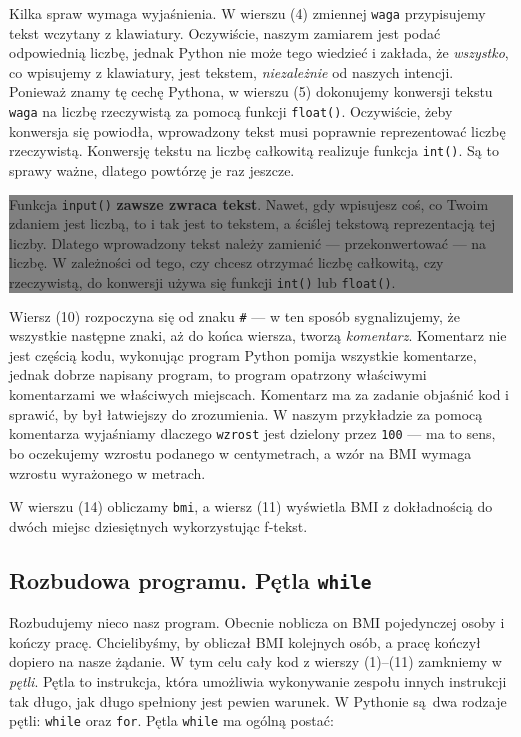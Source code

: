 \documentclass[a4paper]{article}
\newcommand{\important}[1]{
    \begin{center}\colorbox{gray}{
        \begin{minipage}[t]{0.9\textwidth}{#1}
        \end{minipage}
    }
    \end{center}
}
\begin{document}
Kilka spraw wymaga wyjaśnienia. W wierszu (4) zmiennej \texttt{waga} przypisujemy tekst wczytany z klawiatury. Oczywiście, naszym zamiarem jest podać odpowiednią liczbę, jednak Python nie może tego wiedzieć i zakłada, że \emph{wszystko}, co wpisujemy z klawiatury, jest tekstem, \emph{niezależnie} od naszych intencji. Ponieważ znamy tę cechę Pythona, w wierszu (5) dokonujemy konwersji tekstu \texttt{waga} na liczbę rzeczywistą za pomocą funkcji \lstinline|float()|. Oczywiście, żeby konwersja się powiodła, wprowadzony tekst musi poprawnie reprezentować liczbę rzeczywistą. Konwersję tekstu na liczbę całkowitą realizuje funkcja \lstinline|int()|. Są to sprawy ważne, dlatego powtórzę je raz jeszcze.

\important{
  Funkcja \texttt{input()} \textbf{zawsze zwraca tekst}. Nawet, gdy wpisujesz coś, co Twoim zdaniem jest liczbą, to i tak jest to tekstem, a ściślej tekstową reprezentacją tej liczby. Dlatego wprowadzony tekst należy zamienić --- przekonwertować --- na liczbę. W zależności od tego, czy chcesz otrzymać liczbę całkowitą, czy rzeczywistą, do konwersji używa się funkcji \texttt{int()} lub \texttt{float()}.}

Wiersz (10) rozpoczyna się od znaku \texttt{\#} --- w ten sposób sygnalizujemy, że wszystkie następne znaki, aż do końca wiersza, tworzą \emph{komentarz}. Komentarz nie jest częścią kodu, wykonując program Python pomija wszystkie komentarze, jednak dobrze napisany program, to program opatrzony właściwymi komentarzami we właściwych miejscach. Komentarz ma za zadanie objaśnić kod i sprawić, by był łatwiejszy do zrozumienia. W naszym przykładzie za pomocą komentarza wyjaśniamy dlaczego \texttt{wzrost} jest dzielony przez \texttt{100} --- ma to sens, bo oczekujemy wzrostu podanego w centymetrach, a wzór na BMI wymaga wzrostu wyrażonego w metrach.

W wierszu (14) obliczamy \texttt{bmi}, a wiersz (11) wyświetla BMI z dokładnością do dwóch miejsc dziesiętnych wykorzystując f-tekst.

\subsection{Rozbudowa programu. Pętla \texttt{while}}

Rozbudujemy nieco nasz program. Obecnie noblicza on BMI pojedynczej osoby i kończy pracę. Chcielibyśmy, by obliczał BMI kolejnych osób, a pracę kończył dopiero na nasze żądanie. W tym celu cały kod z wierszy (1)--(11) zamkniemy w \emph{pętli}. Pętla to instrukcja, która umożliwia wykonywanie zespołu innych instrukcji tak długo, jak długo spełniony jest pewien warunek. W Pythonie są dwa rodzaje pętli: \lstinline|while| oraz \lstinline|for|. Pętla \lstinline|while| ma ogólną postać:
\end{document}
